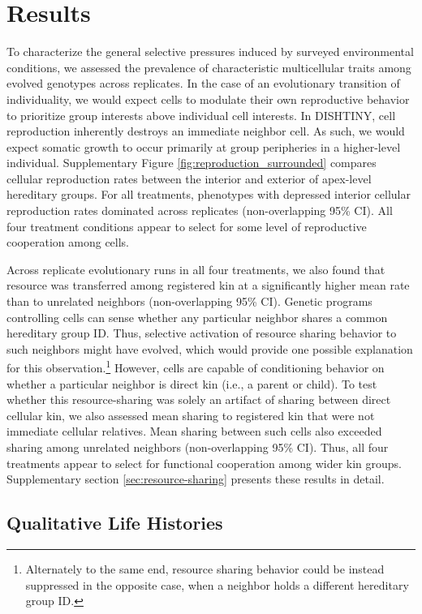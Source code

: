 \section{Results}

To characterize the general selective pressures induced by surveyed environmental conditions, we assessed the prevalence of characteristic multicellular traits among evolved genotypes across replicates.
In the case of an evolutionary transition of individuality, we would expect cells to modulate their own reproductive behavior to prioritize group interests above individual cell interests.
In DISHTINY, cell reproduction inherently destroys an immediate neighbor cell.
As such, we would expect somatic growth to occur primarily at group peripheries in a higher-level individual.
Supplementary Figure \ref{fig:reproduction_surrounded} compares cellular reproduction rates between the interior and exterior of apex-level hereditary groups.
For all treatments, phenotypes with depressed interior cellular reproduction rates dominated across replicates (non-overlapping 95\% CI).
All four treatment conditions appear to select for some level of reproductive cooperation among cells.

Across replicate evolutionary runs in all four treatments, we also found that resource was transferred among registered kin at a significantly higher mean rate than to unrelated neighbors (non-overlapping 95\% CI).
Genetic programs controlling cells can sense whether any particular neighbor shares a common hereditary group ID.
Thus, selective activation of resource sharing behavior to such neighbors might have evolved, which would provide one possible explanation for this observation.\footnote{
Alternately to the same end, resource sharing behavior could be instead suppressed in the opposite case, when a neighbor holds a different hereditary group ID.
}
However, cells are capable of conditioning behavior on whether a particular neighbor is direct kin (i.e., a parent or child).
To test whether this resource-sharing was solely an artifact of sharing between direct cellular kin, we also assessed mean sharing to registered kin that were not immediate cellular relatives.
Mean sharing between such cells also exceeded sharing among unrelated neighbors (non-overlapping 95\% CI).
Thus, all four treatments appear to select for functional cooperation among wider kin groups.
Supplementary section \ref{sec:resource-sharing} presents these results in detail.

\subsection{Qualitative Life Histories} \label{sec:life-histories}

